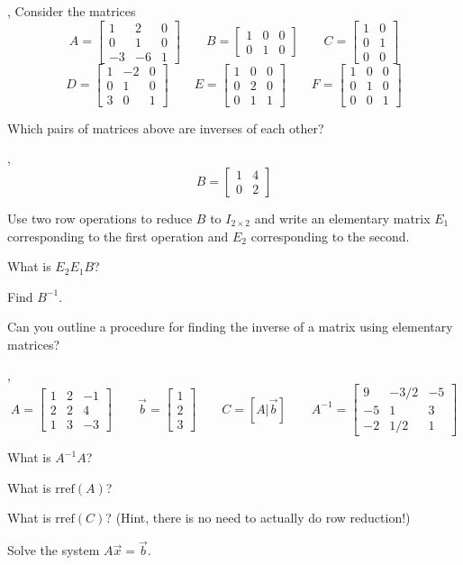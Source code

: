 \documentclass[letter]{article}
\newcommand{\rref}{\mathrm{rref}}
\newcommand{\mat}[1]{\begin{bmatrix}#1\end{bmatrix}}
\renewcommand{\emph}[1]{{\color{defcolor} \textbf{\textit{##1}}}}
\begin{document}
	\vspace{-.8cm}

	\sep
	Consider the matrices 
	\[
		A=\mat{1&2&0\\0&1&0\\-3&-6&1}\qquad
		B=\mat{1&0&0\\0&1&0}\qquad
		C=\mat{1&0\\0&1\\0&0}
	\]
	\[
		D=\mat{1&-2&0\\0&1&0\\3&0&1}\qquad
		E=\mat{1&0&0\\0&2&0\\0&1&1}\qquad
		F=\mat{1&0&0\\0&1&0\\0&0&1}
	\]
	\vspace{-.7cm}
	\begin{Enum}
		\item Which pairs of matrices above are inverses of each other?
	\end{Enum}

	\sep
	\vspace{-.5cm}
	\[
		B=\mat{1 &4\\0 &2}
	\]
	\vspace{-.7cm}
	\begin{Enum}
		\item Use two row operations to reduce $B$ to $I_{2\times 2}$
		and write an elementary matrix $E_1$ corresponding to the first operation
		and $E_2$ corresponding to the second.
		\item What is $E_2E_1B$?
		\item Find $B^{-1}$.
		\item Can you outline a procedure for finding the inverse of a matrix
		using elementary matrices?
	\end{Enum}

	\sep
	\vspace{-.5cm}
	\[
		A=\mat{1&2&-1\\2&2&4\\1&3&-3}\qquad
		\vec b=\mat{1\\2\\3}\qquad
		C=[A|\vec b]\qquad
		A^{-1}=\mat{9&-3/2&-5\\-5&1&3\\-2&1/2&1}
	\]
	\begin{Enum}
		\item What is $A^{-1}A$?
		\item What is $\rref(A)$?
		\item What is $\rref(C)$? (Hint, there is no need to actually do row reduction!)
		\item Solve the system $A\vec x=\vec b$.
	\end{Enum}
\end{document}
